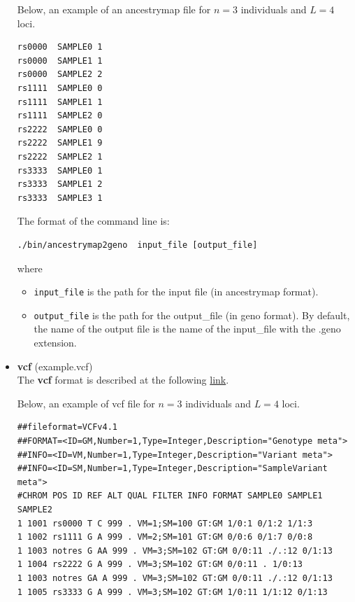 \documentclass[10pt,a4paper]{article}
\begin{document}
\begin{itemize}
Below, an example of an ancestrymap file for $n=3$ individuals and $L=4$ loci.
\begin{center}
\footnotesize
\begin{Verbatim}[frame=single]
rs0000  SAMPLE0 1
rs0000  SAMPLE1 1
rs0000  SAMPLE2 2
rs1111  SAMPLE0 0
rs1111  SAMPLE1 1
rs1111  SAMPLE2 0
rs2222  SAMPLE0 0
rs2222  SAMPLE1 9
rs2222  SAMPLE2 1
rs3333  SAMPLE0 1
rs3333  SAMPLE1 2
rs3333  SAMPLE3 1
\end{Verbatim}
\end{center}

The format of the command line is:
\begin{Verbatim}[frame=single]
./bin/ancestrymap2geno  input_file [output_file]
\end{Verbatim}
where 
\begin{itemize}
\item \verb|input_file| is the path for the input file (in ancestrymap format).
\item \verb|output_file| is the path for the output\_file (in geno format). 
By default, the name of the output file is the name of the input\_file with the .geno extension.
\end{itemize}

\item {\bf vcf} (example.vcf)\\
The {\bf vcf} format is described at the following \href{http://www.1000genomes.org/wiki/Analysis/Variant\%20Call\%20Format/vcf-variant-call-format-version-41}{link}.

Below, an example of vcf file for $n=3$ individuals and $L=4$ loci.
\begin{center}
\footnotesize
\begin{Verbatim}[frame=single]
##fileformat=VCFv4.1 
##FORMAT=<ID=GM,Number=1,Type=Integer,Description="Genotype meta"> 
##INFO=<ID=VM,Number=1,Type=Integer,Description="Variant meta"> 
##INFO=<ID=SM,Number=1,Type=Integer,Description="SampleVariant meta"> 
#CHROM POS ID REF ALT QUAL FILTER INFO FORMAT SAMPLE0 SAMPLE1 SAMPLE2 
1 1001 rs0000 T C 999 . VM=1;SM=100 GT:GM 1/0:1 0/1:2 1/1:3 
1 1002 rs1111 G A 999 . VM=2;SM=101 GT:GM 0/0:6 0/1:7 0/0:8 
1 1003 notres G AA 999 . VM=3;SM=102 GT:GM 0/0:11 ./.:12 0/1:13 
1 1004 rs2222 G A 999 . VM=3;SM=102 GT:GM 0/0:11 . 1/0:13
1 1003 notres GA A 999 . VM=3;SM=102 GT:GM 0/0:11 ./.:12 0/1:13 
1 1005 rs3333 G A 999 . VM=3;SM=102 GT:GM 1/0:11 1/1:12 0/1:13 
\end{Verbatim}
\end{center}


\end{itemize}
\end{document}
